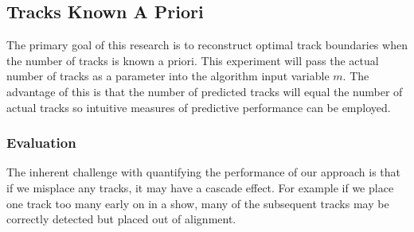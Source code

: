 \documentclass[twocolumn]{article}
\begin{document}
\begin{table}[t]
	
	\centering
	\caption{The shows randomly selected for inclusion in the \textit{GitHub training set}.}
	\label{table:githubset}
	
\end{table}

\subsection{Tracks Known A Priori}\label{sec:apriori}

The primary goal of this research is to reconstruct optimal track boundaries when the number of tracks is known a priori. This experiment will pass the actual number of tracks as a parameter into the algorithm input variable $m$. The advantage of this is that the number of predicted tracks will equal the number of actual tracks so intuitive measures of predictive performance can be employed. 

\subsubsection{Evaluation}\label{eval_crit}

The inherent challenge with quantifying the performance of our approach is that if we misplace any tracks, it may have a cascade effect. For example if we place one track too many early on in a show, many of the subsequent tracks may be correctly detected but placed out of alignment. 
\end{document}
